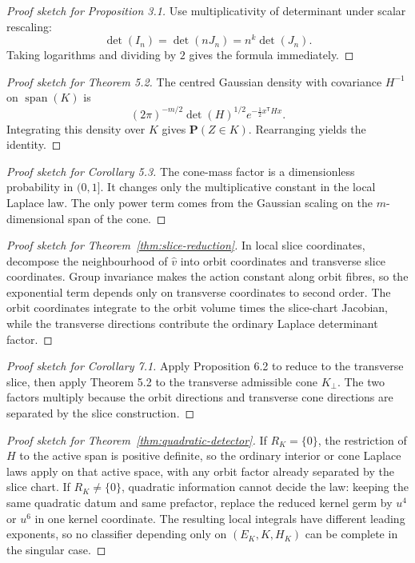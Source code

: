 \documentclass[11pt,a4paper]{article}
\numberwithin{equation}{section}
\DeclareMathOperator{\spanop}{span}
\newcommand{\Prob}{\mathbf P}
\theoremstyle{thmcompact}
\theoremstyle{remark}
\begin{document}
\begin{proof}[Proof sketch for Proposition 3.1]
Use multiplicativity of determinant under scalar rescaling:
\[
\det(I_n)=\det(nJ_n)=n^k\det(J_n).
\]
Taking logarithms and dividing by $2$ gives the formula immediately.
\end{proof}

\begin{proof}[Proof sketch for Theorem 5.2]
The centred Gaussian density with covariance $H^{-1}$ on $\spanop(K)$ is
\[
(2\pi)^{-m/2}\det(H)^{1/2}e^{-\frac12 x^{\mathsf T}Hx}.
\]
Integrating this density over $K$ gives $\Prob(Z\in K)$. Rearranging yields the identity.
\end{proof}

\begin{proof}[Proof sketch for Corollary 5.3]
The cone-mass factor is a dimensionless probability in $(0,1]$. It changes only the multiplicative constant in the local Laplace law. The only power term comes from the Gaussian scaling on the $m$-dimensional span of the cone.
\end{proof}

\begin{proof}[Proof sketch for Theorem~\ref{thm:slice-reduction}]
In local slice coordinates, decompose the neighbourhood of $\hat v$ into orbit coordinates and transverse slice coordinates. Group invariance makes the action constant along orbit fibres, so the exponential term depends only on transverse coordinates to second order. The orbit coordinates integrate to the orbit volume times the slice-chart Jacobian, while the transverse directions contribute the ordinary Laplace determinant factor.
\end{proof}

\begin{proof}[Proof sketch for Corollary 7.1]
Apply Proposition 6.2 to reduce to the transverse slice, then apply Theorem 5.2 to the transverse admissible cone $K_{\perp}$. The two factors multiply because the orbit directions and transverse cone directions are separated by the slice construction.
\end{proof}

\begin{proof}[Proof sketch for Theorem~\ref{thm:quadratic-detector}]
If $R_K=\{0\}$, the restriction of $H$ to the active span is positive definite, so the ordinary interior or cone Laplace laws apply on that active space, with any orbit factor already separated by the slice chart. If $R_K\neq\{0\}$, quadratic information cannot decide the law: keeping the same quadratic datum and same prefactor, replace the reduced kernel germ by $u^4$ or $u^6$ in one kernel coordinate. The resulting local integrals have different leading exponents, so no classifier depending only on $(E_K,K,H_K)$ can be complete in the singular case.
\end{proof}
\end{document}
